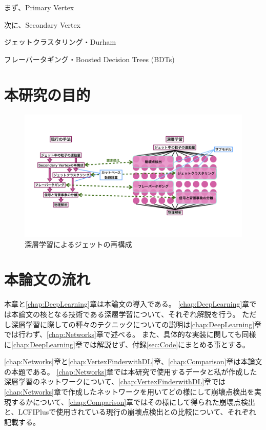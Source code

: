 まず、Primary Vertex

次に、Secondary Vertex

ジェットクラスタリング・Durham

フレーバータギング・Boosted Decision Trees (BDTs)

\section{本研究の目的} \label{Intro:Purpose}

\begin{figure}[h]
 \centering
 \includegraphics[width=1.0\textwidth]{Figure/1Introduction/6JetReconstructionwithDeepLearning.png}
 \caption{深層学習によるジェットの再構成}
 \label{6JetReconstructionwithDeepLearning}
\end{figure}


\section{本論文の流れ} \label{Intro:Flow}

本章と\ref{chap:DeepLearning}章は本論文の導入である。
\ref{chap:DeepLearning}章では本論文の核となる技術である深層学習について、それぞれ解説を行う。
ただし深層学習に際しての種々のテクニックについての説明は\ref{chap:DeepLearning}章では行わず、\ref{chap:Networks}章で述べる。
また、具体的な実装に関しても同様に\ref{chap:DeepLearning}章では解説せず、付録\ref{sec:Code}にまとめる事とする。

\ref{chap:Networks}章と\ref{chap:VertexFinderwithDL}章、\ref{chap:Comparison}章は本論文の本題である。
\ref{chap:Networks}章では本研究で使用するデータと私が作成した深層学習のネットワークについて、\ref{chap:VertexFinderwithDL}章では\ref{chap:Networks}章で作成したネットワークを用いてどの様にして崩壊点検出を実現するかについて、\ref{chap:Comparison}章ではその様にして得られた崩壊点検出と、LCFIPlusで使用されている現行の崩壊点検出との比較について、それぞれ記載する。















